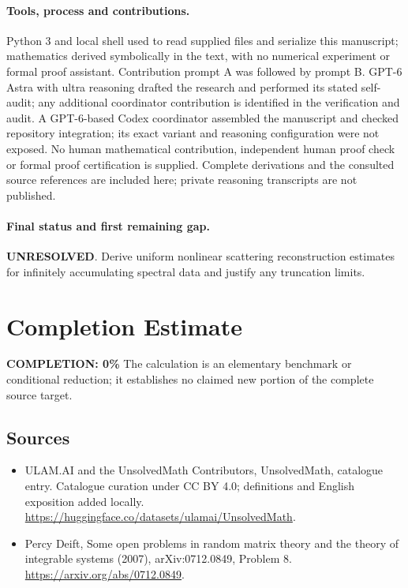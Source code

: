 \documentclass[11pt]{article}
\begin{document}
\paragraph{Tools, process and contributions.}
Python 3 and local shell used to read supplied files and serialize this manuscript; mathematics derived symbolically in the text, with no numerical experiment or formal proof assistant. Contribution prompt A was followed by prompt B. GPT-6 Astra with ultra reasoning drafted the research and performed its stated self-audit; any additional coordinator contribution is identified in the verification and audit. A GPT-6-based Codex coordinator assembled the manuscript and checked repository integration; its exact variant and reasoning configuration were not exposed. No human mathematical contribution, independent human proof check or formal proof certification is supplied. Complete derivations and the consulted source references are included here; private reasoning transcripts are not published.

\paragraph{Final status and first remaining gap.}
\textbf{UNRESOLVED}. Derive uniform nonlinear scattering reconstruction estimates for infinitely accumulating spectral data and justify any truncation limits.

\section{Completion Estimate}
\noindent\textbf{COMPLETION: 0\%}
The calculation is an elementary benchmark or conditional reduction; it establishes no claimed new portion of the complete source target.

\subsection{Sources}
\begin{itemize}
\item[\hypertarget{source:statement:1}{S1}] ULAM.AI and the UnsolvedMath Contributors, UnsolvedMath, catalogue entry. Catalogue curation under CC BY 4.0; definitions and English exposition added locally.
\url{https://huggingface.co/datasets/ulamai/UnsolvedMath}.
\item[\hypertarget{source:statement:2}{S2}] Percy Deift, Some open problems in random matrix theory and the theory of integrable systems (2007), arXiv:0712.0849, Problem 8.
\url{https://arxiv.org/abs/0712.0849}.
\end{itemize}
\label{end:statement}
\end{document}
